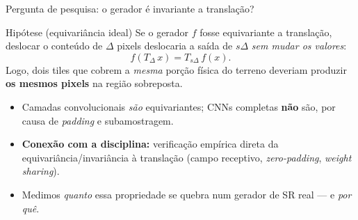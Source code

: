 \documentclass[aspectratio=169]{beamer}
\begin{document}
\begin{frame}{Pergunta de pesquisa: o gerador é invariante a translação?}

  \begin{block}{Hipótese (equivariância ideal)}
    Se o gerador $f$ fosse equivariante a translação, deslocar o conteúdo de $\Delta$
    pixels deslocaria a saída de $s\Delta$ \emph{sem mudar os valores}:
    \[
      f(T_\Delta\, x) = T_{s\Delta}\, f(x).
    \]
    Logo, dois tiles que cobrem a \emph{mesma} porção física do terreno deveriam
    produzir \textbf{os mesmos pixels} na região sobreposta.
  \end{block}

  \vspace{0.4em}
  \begin{itemize}
    \item Camadas convolucionais \emph{são} equivariantes; CNNs completas
          \textbf{não} são, por causa de \textit{padding} e subamostragem.
    \item \textbf{Conexão com a disciplina:} verificação empírica direta da
          equivariância/invariância à translação (campo receptivo, \textit{zero-padding},
          \textit{weight sharing}).
    \item Medimos \emph{quanto} essa propriedade se quebra num gerador de SR real ---
          e \emph{por quê}.
  \end{itemize}

\end{frame}
\end{document}
